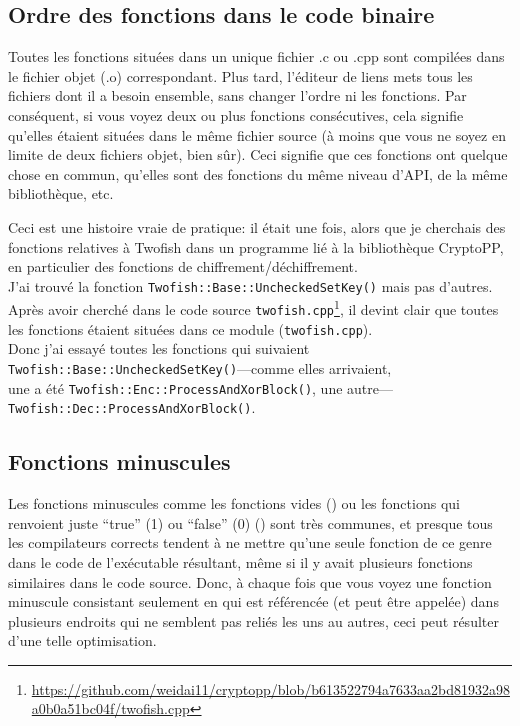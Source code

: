 \subsection{Ordre des fonctions dans le code binaire}

Toutes les fonctions situées dans un unique fichier .c ou .cpp sont compilées dans
le fichier objet (.o) correspondant.
Plus tard, l'éditeur de liens mets tous les fichiers dont il a besoin ensemble, sans
changer l'ordre ni les fonctions.
Par conséquent, si vous voyez deux ou plus fonctions consécutives, cela signifie
qu'elles étaient situées dans le même fichier source (à moins que vous ne soyez en
limite de deux fichiers objet, bien sûr).
Ceci signifie que ces fonctions ont quelque chose en commun, qu'elles sont des fonctions
du même niveau d'\ac{API}, de la même bibliothèque, etc.

Ceci est une histoire vraie de pratique: il était une fois, alors que je cherchais
des fonctions relatives à Twofish dans un programme lié à la bibliothèque CryptoPP,
en particulier des fonctions de chiffrement/déchiffrement.\\
J'ai trouvé la fonction \verb|Twofish::Base::UncheckedSetKey()| mais pas d'autres.
Après avoir cherché dans le code source
\verb|twofish.cpp|\footnote{\url{https://github.com/weidai11/cryptopp/blob/b613522794a7633aa2bd81932a98a0b0a51bc04f/twofish.cpp}},
il devint clair que toutes les fonctions étaient situées dans ce module (\verb|twofish.cpp|).\\
Donc j'ai essayé toutes les fonctions qui suivaient \verb|Twofish::Base::UncheckedSetKey()|---comme elles arrivaient,\\
une a été \verb|Twofish::Enc::ProcessAndXorBlock()|, une autre---\verb|Twofish::Dec::ProcessAndXorBlock()|.

\subsection{Fonctions minuscules}

Les fonctions minuscules comme les fonctions vides ()
ou les fonctions qui renvoient juste ``true'' (1) ou ``false'' (0) ()
sont très communes, et presque tous les compilateurs corrects tendent à ne mettre
qu'une seule fonction de ce genre dans le code de l'exécutable résultant, même si
il y avait plusieurs fonctions similaires dans le code source.
Donc, à chaque fois que vous voyez une fonction minuscule consistant seulement en
 qui est référencée (et peut être appelée) dans plusieurs endroits
qui ne semblent pas reliés les uns au autres, ceci peut résulter d'une telle optimisation.%

